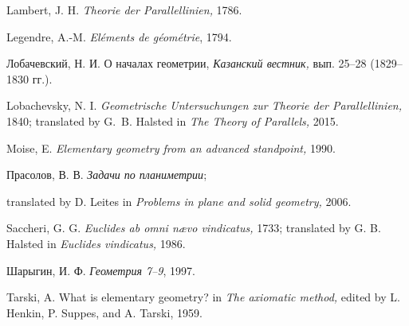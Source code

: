 \begin{thebibliography}{52}
Lambert, J. H.
\textit{Theorie der Parallellinien,}
1786.

Legendre, A.-M.
\textit{El\'ements de g\'eom\'etrie}, 1794.

\begin{otherlanguage}{russian}
Лобачевский, Н. И.  
О началах геометрии, 
\textit{Казанский вестник,} вып. 25--28 (1829--1830 гг.).
\end{otherlanguage}

Lobachevsky, N. I.
\textit{Geometrische Untersuchungen zur Theorie der Parallellinien,} 1840;
translated by G.~B. Halsted in \textit{The Theory of Parallels,} 2015.



Moise, E.
\textit{Elementary geometry from an advanced standpoint,}  
1990.

\begin{otherlanguage}{russian}
Прасолов, В. В. \textit{Задачи по планиметрии};
\end{otherlanguage}
translated by D. Leites in
\textit{Problems in plane and solid geometry,} 
 2006.

Saccheri, G. G.
\textit{Euclides ab omni n\ae vo vindicatus,} 
1733; translated by G. B. Halsted in \textit{Euclides vindicatus,} 1986.


\begin{otherlanguage}{russian}
Шарыгин, И. Ф.
\textit{Геометрия 7--9}, %
1997.
\end{otherlanguage}

 Tarski, A.
What is elementary geometry? in
\textit{The axiomatic method,} edited by L. Henkin, P. Suppes, and A. Tarski,
1959.



\end{thebibliography}
